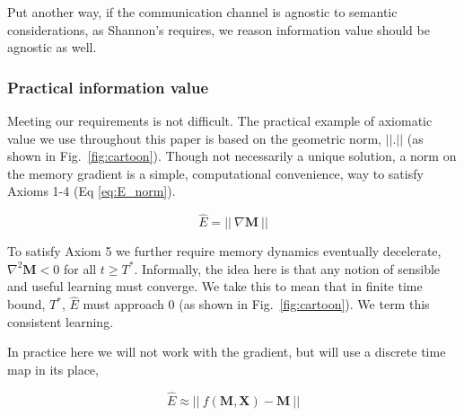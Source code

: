 Put another way, if the communication channel is agnostic to semantic considerations, as Shannon's requires, we reason information value should be agnostic as well.


\subsubsection*{Practical information value}
Meeting our requirements is not difficult. The practical example of axiomatic value we use throughout this paper is based on the geometric norm, $||.||$ (as shown in Fig.~\ref{fig:cartoon}). Though not necessarily a unique solution, a norm on the memory gradient is a simple, computational convenience, way to satisfy Axioms 1-4 (Eq \ref{eq:E_norm}). 

\begin{equation}
	\label{eq:E_norm}
	\hat E = || \ \nabla \mathbf{M} \ ||
\end{equation}

To satisfy Axiom 5 we further require memory dynamics eventually decelerate,  $\nabla^2 \mathbf{M} < 0$ for all $ t \ge T^*$. Informally, the idea here is that any notion of sensible and useful learning must converge. We take this to mean that in finite time bound, $T^*$, $\hat E$ must approach 0 (as shown in Fig.~\ref{fig:cartoon}). We term this consistent learning.

In practice here we will not work with the gradient, but will use a discrete time map in its place,

\begin{equation}
	\label{eq:E_norm_discrete}
	\hat E \approx || \ f(\mathbf{M},\mathbf{X}) - \mathbf{M} \ ||
\end{equation}

